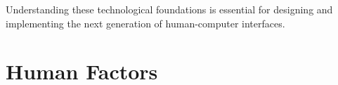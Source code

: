 \documentclass[11pt,a4paper]{article}
\theoremstyle{definition}
\theoremstyle{plain}
\theoremstyle{remark}
\begin{document}
Understanding these technological foundations is essential for designing and implementing the next generation of human-computer interfaces. 



\section{Human Factors}
\end{document}
